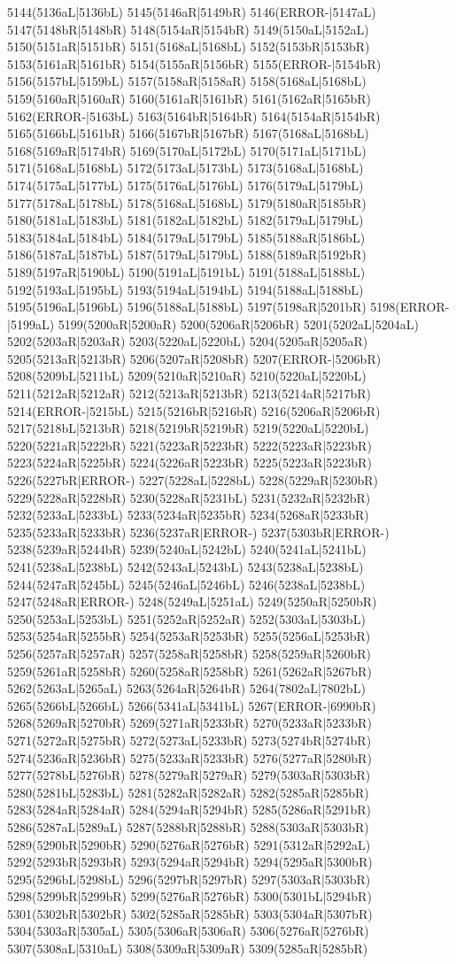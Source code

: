 5144(5136aL|5136bL) 5145(5146aR|5149bR) 5146(ERROR-|5147aL) 5147(5148bR|5148bR) 5148(5154aR|5154bR) 5149(5150aL|5152aL) 5150(5151aR|5151bR) 5151(5168aL|5168bL) 5152(5153bR|5153bR) 5153(5161aR|5161bR) 5154(5155aR|5156bR) 5155(ERROR-|5154bR) 5156(5157bL|5159bL) 5157(5158aR|5158aR) 5158(5168aL|5168bL) 5159(5160aR|5160aR) 5160(5161aR|5161bR) 5161(5162aR|5165bR) 5162(ERROR-|5163bL) 5163(5164bR|5164bR) 5164(5154aR|5154bR) 5165(5166bL|5161bR) 5166(5167bR|5167bR) 5167(5168aL|5168bL) 5168(5169aR|5174bR) 5169(5170aL|5172bL) 5170(5171aL|5171bL) 5171(5168aL|5168bL) 5172(5173aL|5173bL) 5173(5168aL|5168bL) 5174(5175aL|5177bL) 5175(5176aL|5176bL) 5176(5179aL|5179bL) 5177(5178aL|5178bL) 5178(5168aL|5168bL) 5179(5180aR|5185bR) 5180(5181aL|5183bL) 5181(5182aL|5182bL) 5182(5179aL|5179bL) 5183(5184aL|5184bL) 5184(5179aL|5179bL) 5185(5188aR|5186bL) 5186(5187aL|5187bL) 5187(5179aL|5179bL) 5188(5189aR|5192bR) 5189(5197aR|5190bL) 5190(5191aL|5191bL) 5191(5188aL|5188bL) 5192(5193aL|5195bL) 5193(5194aL|5194bL) 5194(5188aL|5188bL) 5195(5196aL|5196bL) 5196(5188aL|5188bL) 5197(5198aR|5201bR) 5198(ERROR-|5199aL) 5199(5200aR|5200aR) 5200(5206aR|5206bR) 5201(5202aL|5204aL) 5202(5203aR|5203aR) 5203(5220aL|5220bL) 5204(5205aR|5205aR) 5205(5213aR|5213bR) 5206(5207aR|5208bR) 5207(ERROR-|5206bR) 5208(5209bL|5211bL) 5209(5210aR|5210aR) 5210(5220aL|5220bL) 5211(5212aR|5212aR) 5212(5213aR|5213bR) 5213(5214aR|5217bR) 5214(ERROR-|5215bL) 5215(5216bR|5216bR) 5216(5206aR|5206bR) 5217(5218bL|5213bR) 5218(5219bR|5219bR) 5219(5220aL|5220bL) 5220(5221aR|5222bR) 5221(5223aR|5223bR) 5222(5223aR|5223bR) 5223(5224aR|5225bR) 5224(5226aR|5223bR) 5225(5223aR|5223bR) 5226(5227bR|ERROR-) 5227(5228aL|5228bL) 5228(5229aR|5230bR) 5229(5228aR|5228bR) 5230(5228aR|5231bL) 5231(5232aR|5232bR) 5232(5233aL|5233bL) 5233(5234aR|5235bR) 5234(5268aR|5233bR) 5235(5233aR|5233bR) 5236(5237aR|ERROR-) 5237(5303bR|ERROR-) 5238(5239aR|5244bR) 5239(5240aL|5242bL) 5240(5241aL|5241bL) 5241(5238aL|5238bL) 5242(5243aL|5243bL) 5243(5238aL|5238bL) 5244(5247aR|5245bL) 5245(5246aL|5246bL) 5246(5238aL|5238bL) 5247(5248aR|ERROR-) 5248(5249aL|5251aL) 5249(5250aR|5250bR) 5250(5253aL|5253bL) 5251(5252aR|5252aR) 5252(5303aL|5303bL) 5253(5254aR|5255bR) 5254(5253aR|5253bR) 5255(5256aL|5253bR) 5256(5257aR|5257aR) 5257(5258aR|5258bR) 5258(5259aR|5260bR) 5259(5261aR|5258bR) 5260(5258aR|5258bR) 5261(5262aR|5267bR) 5262(5263aL|5265aL) 5263(5264aR|5264bR) 5264(7802aL|7802bL) 5265(5266bL|5266bL) 5266(5341aL|5341bL) 5267(ERROR-|6990bR) 5268(5269aR|5270bR) 5269(5271aR|5233bR) 5270(5233aR|5233bR) 5271(5272aR|5275bR) 5272(5273aL|5233bR) 5273(5274bR|5274bR) 5274(5236aR|5236bR) 5275(5233aR|5233bR) 5276(5277aR|5280bR) 5277(5278bL|5276bR) 5278(5279aR|5279aR) 5279(5303aR|5303bR) 5280(5281bL|5283bL) 5281(5282aR|5282aR) 5282(5285aR|5285bR) 5283(5284aR|5284aR) 5284(5294aR|5294bR) 5285(5286aR|5291bR) 5286(5287aL|5289aL) 5287(5288bR|5288bR) 5288(5303aR|5303bR) 5289(5290bR|5290bR) 5290(5276aR|5276bR) 5291(5312aR|5292aL) 5292(5293bR|5293bR) 5293(5294aR|5294bR) 5294(5295aR|5300bR) 5295(5296bL|5298bL) 5296(5297bR|5297bR) 5297(5303aR|5303bR) 5298(5299bR|5299bR) 5299(5276aR|5276bR) 5300(5301bL|5294bR) 5301(5302bR|5302bR) 5302(5285aR|5285bR) 5303(5304aR|5307bR) 5304(5303aR|5305aL) 5305(5306aR|5306aR) 5306(5276aR|5276bR) 5307(5308aL|5310aL) 5308(5309aR|5309aR) 5309(5285aR|5285bR) 